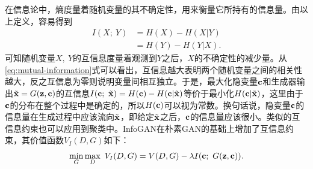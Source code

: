 在信息论中，熵度量着随机变量的其不确定性，用来衡量它所持有的信息量。由以上定义，容易得到
\begin{equation}
  \begin{split}
    I(X;~Y) &= H(X) - H(X|Y) \\
    &= H(Y) - H(Y|X).
  \end{split}
\end{equation}
可知随机变量$X,~Y$的互信息度量着观测到$Y$之后，$X$的不确定性的减少量。从\eqref{eq:mutual-information}式可以看出，互信息越大表明两个随机变量之间的相关性越大，反之互信息为零则说明变量间相互独立。于是，最大化隐变量$\mathbf{c}$和生成器输出$\tilde{\mathbf{x}} = G(\mathbf{z}, \mathbf{c})$的互信息$I(\mathbf{c}; ~\tilde{\mathbf{x}}) = H(\mathbf{c}) - H(\mathbf{c}|\tilde{\mathbf{x}})$等价于最小化$H(\mathbf{c}|\tilde{\mathbf{x}})$，这里由于$\mathbf{c}$的分布在整个过程中是确定的，所以$H(\mathbf{c})$可以视为常数。换句话说，隐变量$\mathbf{c}$的信息量在生成过程中应该流向$\tilde{\mathbf{x}}$，即给定$\tilde{\mathbf{x}}$之后，$\mathbf{c}$的信息量应该很小。类似的互信息约束也可以应用到聚类中\citep{bridle1992unsupervised,barber2006kernelized,krause2010discriminative}。InfoGAN在朴素GAN的基础上增加了互信息约束，其价值函数$V_I(D,G)$如下：
\begin{equation}
  \min_G\max_D ~V_I(D,G) = V(D,G) - \lambda I(\mathbf{c};~G(\mathbf{z},\mathbf{c})).
\end{equation}


